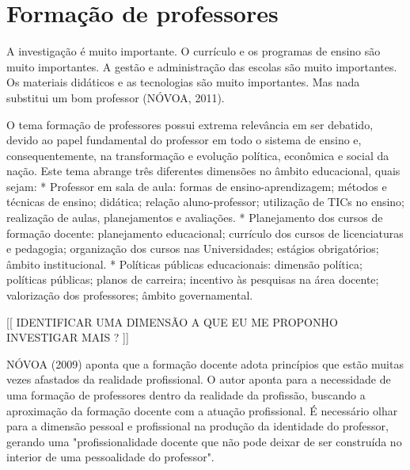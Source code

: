 
\section{Formação de professores}%


	A investigação é muito importante. O currículo e os programas de ensino são muito importantes. A gestão e administração das escolas são muito importantes. Os materiais didáticos e as tecnologias são muito importantes. Mas nada substitui um bom professor (NÓVOA, 2011).
 
	
	O tema formação de professores possui extrema relevância em ser debatido, devido ao papel fundamental do professor em todo o sistema de ensino e, consequentemente, na transformação e evolução política, econômica e social da nação. Este tema abrange três diferentes dimensões no âmbito educacional, quais sejam:
	* Professor em sala de aula:  formas de ensino-aprendizagem; métodos e técnicas de ensino; didática; relação aluno-professor; utilização de TICs no ensino; realização de aulas, planejamentos e avaliações.
	* Planejamento dos cursos de formação docente: planejamento educacional; currículo dos cursos de licenciaturas e pedagogia; organização dos cursos nas Universidades; estágios obrigatórios; âmbito institucional.
	* Políticas públicas educacionais: dimensão política; políticas públicas; planos de carreira; incentivo às pesquisas na área docente; valorização dos professores; âmbito governamental.
 
[[ IDENTIFICAR UMA DIMENSÃO A QUE EU ME PROPONHO INVESTIGAR MAIS ? ]]
 
	NÓVOA (2009) aponta que a formação docente adota princípios que estão muitas vezes afastados da realidade profissional. O autor aponta para a necessidade de uma formação de professores dentro da realidade da profissão, buscando a aproximação da formação docente com a atuação profissional. É necessário olhar para a dimensão pessoal e profissional na produção da identidade do professor, gerando uma "profissionalidade docente que não pode deixar de ser construída no interior de uma pessoalidade do professor".
    
